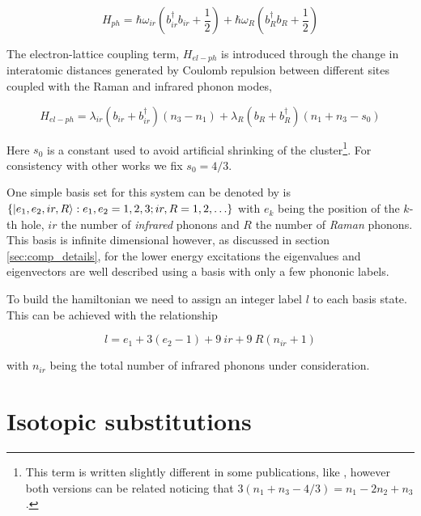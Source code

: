 \begin{equation}
 \label{eq:phonon-part}
 H_{ph} = \hbar \omega_{ir}\left(b_{ir}^\dagger b_{ir}+\frac{1}{2}\right) + \hbar \omega_R \left( b_R^\dagger b_R + \frac{1}{2}\right)
\end{equation}

 
The electron-lattice coupling term, $H_{el-ph}$ is introduced through the change in interatomic distances generated by Coulomb repulsion between different sites coupled with the Raman and infrared phonon modes,
 
\begin{equation}
  \label{eq:coupling-part}
  H_{el-ph} = \lambda_{ir}(b_{ir} + b_{ir}^\dagger)(n_3 - n_1) + \lambda_R (b_R + b_R^\dagger)(n_1 + n_3-s_0)
\end{equation}

Here $s_0$ is a constant used to avoid artificial shrinking of the cluster\footnote{This term is written slightly different in some publications, like \cite{MustredeLeon1992}, however both versions can be related noticing that $3 (n_1+n_3-4/3)=n_1-2n_2+n_3$.}. 
For consistency with other works \cite{MustredeLeon1992,DeLeon1999,Leon2008,MirandaMena2007} we fix $s_0=4/3$.


One simple basis set for this system can be denoted by is $\{\left | e_1,e_2,ir,R \right\rangle: e_1,e_2=1,2,3; ir,R=1,2,\ldots\}$ with $e_k$ being the position of the $k$-th hole, $ir$ the number of \textit{infrared} phonons and $R$ the number of \textit{Raman} phonons. 
This basis is infinite dimensional however, as discussed in section \ref{sec:comp_details}, for the lower energy excitations the eigenvalues and eigenvectors are well described using a basis with only a few phononic labels.

To build the hamiltonian we need to assign an integer label $l$ to each basis state. 
This can be achieved with the relationship

\begin{equation}
  \label{eq:label}
  l = e_1 + 3(e_2 - 1) + 9\ ir + 9\ R (n_{ir} +1)
\end{equation}

\noindent with $n_{ir}$ being the total number of infrared phonons under consideration.

\section{Isotopic substitutions}
\label{sec:isotopic-model}

